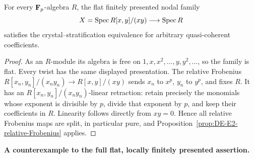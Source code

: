 \begin{corollary}\label{cor:DE-E2-relative-node}
For every $\mathbf F_p$-algebra $R$, the flat finitely presented nodal family
\[
                    X=\operatorname{Spec} R[x,y]/(xy)\longrightarrow\operatorname{Spec} R
\]
satisfies the crystal--stratification equivalence for arbitrary quasi-coherent coefficients.
\end{corollary}
\begin{proof}
As an $R$-module its algebra is free on $1,x,x^2,\ldots,y,y^2,\ldots$, so the family is flat.  Every twist has the same displayed presentation.  The relative Frobenius $R[x_n,y_n]/(x_ny_n)\to R[x,y]/(xy)$ sends $x_n$ to $x^p$, $y_n$ to $y^p$, and fixes $R$.  It has an $R[x_n,y_n]/(x_ny_n)$-linear retraction: retain precisely the monomials whose exponent is divisible by $p$, divide that exponent by $p$, and keep their coefficients in $R$.  Linearity follows directly from $xy=0$.  Hence all relative Frobenius maps are split, in particular pure, and Proposition~\ref{prop:DE-E2-relative-Frobenius} applies.
\end{proof}

\par\smallskip\noindent\textbf{A counterexample to the full flat, locally finitely presented assertion.}

